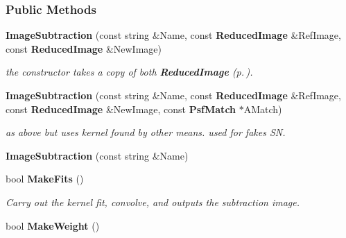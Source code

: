 \subsubsection*{Public Methods}
\begin{CompactItemize}
\item 
{}
{\bf Image\-Subtraction} (const string \&Name, const {\bf Reduced\-Image} \&Ref\-Image, const {\bf Reduced\-Image} \&New\-Image)\label{class_imagesubtraction_a0}

\begin{CompactList}\small\item\em the constructor takes a copy of both {\bf Reduced\-Image} {\rm (p.\,\pageref{class_reducedimage})}.\item\end{CompactList}\item 
{}
{\bf Image\-Subtraction} (const string \&Name, const {\bf Reduced\-Image} \&Ref\-Image, const {\bf Reduced\-Image} \&New\-Image, const {\bf Psf\-Match} $\ast$AMatch)\label{class_imagesubtraction_a1}

\begin{CompactList}\small\item\em as above but uses kernel found by other means. used for fakes SN.\item\end{CompactList}\item 
{}
{\bf Image\-Subtraction} (const string \&Name)\label{class_imagesubtraction_a2}

\item 
{}
bool {\bf Make\-Fits} ()\label{class_imagesubtraction_a3}

\begin{CompactList}\small\item\em Carry out the kernel fit, convolve, and outputs the subtraction image.\item\end{CompactList}\item 
{}
bool {\bf Make\-Weight} ()\label{class_imagesubtraction_a4}


\end{CompactItemize}
